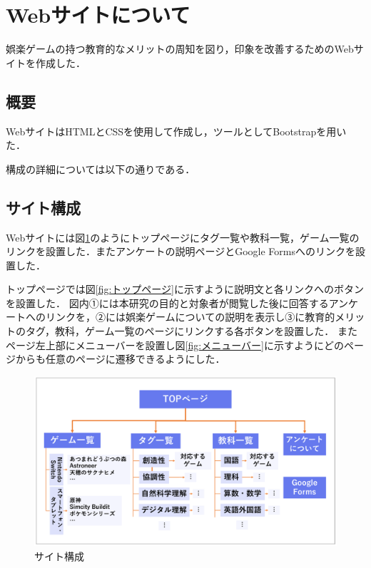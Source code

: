 \section{Webサイトについて}\label{Webサイトについて}
娯楽ゲームの持つ教育的なメリットの周知を図り，印象を改善するためのWebサイトを作成した．

\subsection{概要}
WebサイトはHTMLとCSSを使用して作成し，ツールとしてBootstrapを用いた．

構成の詳細については以下の通りである．

\subsection{サイト構成}
Webサイトには図\ref{fig:サイト構成}のようにトップページにタグ一覧や教科一覧，ゲーム一覧のリンクを設置した．またアンケートの説明ページとGoogle Formsへのリンクを設置した．

トップページでは図\ref{fig:トップページ}に示すように説明文と各リンクへのボタンを設置した．
図内①には本研究の目的と対象者が閲覧した後に回答するアンケートへのリンクを，②には娯楽ゲームについての説明を表示し③に教育的メリットのタグ，教科，ゲーム一覧のページにリンクする各ボタンを設置した．
またページ左上部にメニューバーを設置し図\ref{fig:メニューバー}に示すようにどのページからも任意のページに遷移できるようにした．

\begin{figure}[H]
\begin{center}
 \includegraphics[keepaspectratio, scale=0.35]{PDF/サイト構成.pdf}
\end{center}
 \caption{サイト構成}
 \label{fig:サイト構成}
\end{figure}

